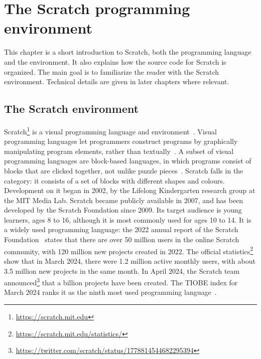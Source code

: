 \documentclass[../main]{subfiles}
\begin{document}
\chapter{The Scratch programming environment}\label{ch:scratch-the-programming-environment}


This chapter is a short introduction to Scratch, both the programming language and the environment.
It also explains how the source code for Scratch is organized.
The main goal is to familiarize the reader with the Scratch environment.
Technical details are given in later chapters where relevant.

\section{The Scratch environment}\label{sec:scratch-environment}

Scratch\footnote{\url{https://scratch.mit.edu}} is a visual programming language and environment~\autocite{resnickScratchProgrammingAll2009}.
Visual programming languages let programmers construct programs by graphically manipulating program elements, rather than textually~\autocite{kelleherLoweringBarriersProgramming2005}.
A subset of visual programming languages are block-based languages, in which programs consist of blocks that are clicked together, not unlike puzzle pieces~\autocite{weintropBlockNotBlock2015}.
Scratch falls in the category: it consists of a set of blocks with different shapes and colours.
Development on it began in 2002, by the Lifelong Kindergarten research group at the MIT Media Lab.
Scratch became publicly available in 2007, and has been developed by the Scratch Foundation since 2009.
Its target audience is young learners, ages 8 to 16, although it is most commonly used for ages 10 to 14.
It is a widely used programming language: the 2022 annual report of the Scratch Foundation~\autocite{scratchfoundationGrowingGlobalCreative2022} states that there are over 50 million users in the online Scratch community, with 120 million new projects created in 2022.
The official statistics\footnote{\url{https://scratch.mit.edu/statistics/}} show that in March 2024, there were 1.2 million active monthly users, with about 3.5 million new projects in the same month.
In April 2024, the Scratch team announced\footnote{\url{https://twitter.com/scratch/status/1778814544682295394}} that a billion projects have been created.
The TIOBE index for March 2024 ranks it as the ninth most used programming language~\autocite{tiobeTIOBEIndexMarch2024}.
\end{document}
